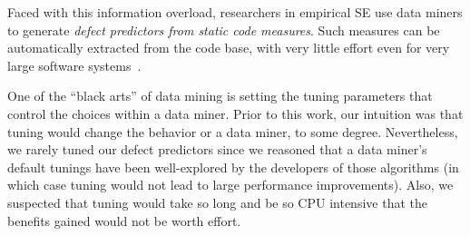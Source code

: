 \documentclass{sig-alternative}
\begin{document}
Faced with this information overload,
researchers in empirical SE
use  data miners  to generate 
{\em defect predictors from static code measures}.
Such   measures can be
automatically extracted from the code base, with very little effort
even for very large software systems~\cite{nagappan05}. 

One of the ``black arts'' of data mining is setting the tuning
parameters that control  the choices within a data miner.
Prior to this work, our intuition was that tuning would change the behavior or a data miner, to some degree. Nevertheless, we rarely tuned our  defect predictors 
since we reasoned
that a data miner's default tunings have been well-explored by the developers of those algorithms (in which case
tuning would not lead to large performance improvements).
Also, we suspected that
tuning would take so long and be so CPU intensive that the benefits gained   would not be worth effort.
\end{document}
